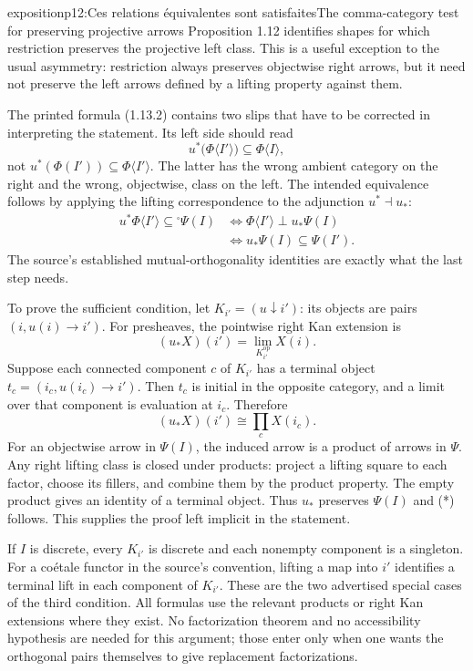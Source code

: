 \begin{dcomment}{exposition}{p12:Ces relations équivalentes sont satisfaites}{The comma-category test for preserving projective arrows}
Proposition 1.12 identifies shapes for which restriction preserves the projective left class. This is a useful exception to the usual asymmetry: restriction always preserves objectwise right arrows, but it need not preserve the left arrows defined by a lifting property against them.

The printed formula (1.13.2) contains two slips that have to be corrected in interpreting the statement. Its left side should read
\[
 u^*\bigl(\Phi\langle I'\rangle\bigr)
       \subseteq\Phi\langle I\rangle,
 \tag{*}
\]
not $u^*(\Phi(I'))\subseteq\Phi\langle I'\rangle$. The latter has the wrong ambient category on the right and the wrong, objectwise, class on the left. The intended equivalence follows by applying the lifting correspondence to the adjunction $u^*\dashv u_*$:
\[
\begin{aligned}
u^*\Phi\langle I'\rangle\subseteq{}^{\square}\Psi(I)
&\Longleftrightarrow
\Phi\langle I'\rangle\perp u_*\Psi(I)\\
&\Longleftrightarrow
u_*\Psi(I)\subseteq\Psi(I').
\end{aligned}
\]
The source's established mutual-orthogonality identities are exactly what the last step needs.

To prove the sufficient condition, let $K_{i'}=(u\downarrow i')$: its objects are pairs $(i,u(i)\to i')$. For presheaves, the pointwise right Kan extension is
\[
 (u_*X)(i')=\lim_{K_{i'}^{\mathrm{op}}}X(i).
\]
Suppose each connected component $c$ of $K_{i'}$ has a terminal object $t_c=(i_c,u(i_c)\to i')$. Then $t_c$ is initial in the opposite category, and a limit over that component is evaluation at $i_c$. Therefore
\[
 (u_*X)(i')\cong\prod_cX(i_c).
\]
For an objectwise arrow in $\Psi(I)$, the induced arrow is a product of arrows in $\Psi$. Any right lifting class is closed under products: project a lifting square to each factor, choose its fillers, and combine them by the product property. The empty product gives an identity of a terminal object. Thus $u_*$ preserves $\Psi(I)$ and (*) follows. This supplies the proof left implicit in the statement.

If $I$ is discrete, every $K_{i'}$ is discrete and each nonempty component is a singleton. For a coétale functor in the source's convention, lifting a map into $i'$ identifies a terminal lift in each component of $K_{i'}$. These are the two advertised special cases of the third condition. All formulas use the relevant products or right Kan extensions where they exist. No factorization theorem and no accessibility hypothesis are needed for this argument; those enter only when one wants the orthogonal pairs themselves to give replacement factorizations.
\end{dcomment}

